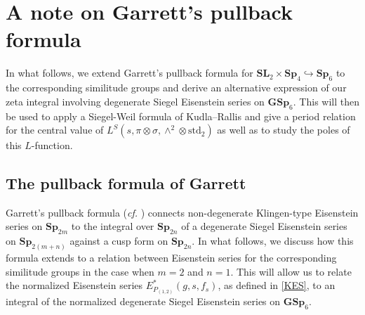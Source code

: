 \documentclass[11pt, reqno]{amsart}
\theoremstyle{plain}
\theoremstyle{definition}
\theoremstyle{remark}
\theoremstyle{plain}
\def\SL{{\mathbf{SL}}}
\def\GSp{{\mathbf{GSp}}}
\def\Sp{{\mathbf{Sp}}}
\begin{document}
\section{A note on Garrett's pullback formula}

In what follows, we extend Garrett's pullback formula for $\SL_2\times \Sp_4\hookrightarrow \Sp_6$ to the corresponding similitude groups and derive an alternative expression of our zeta integral involving degenerate Siegel Eisenstein series on $\GSp_6$. This will then be used to apply a Siegel-Weil formula of Kudla--Rallis and give a period relation for the central value of $L^S(s,\pi \otimes \sigma, \wedge^2 \otimes  \mathrm{std}_2)$ as well as to study the poles of this $L$-function. 

\subsection{The pullback formula of Garrett}\label{Section:Garrett:Pullback}
Garrett's pullback formula (\textit{cf.}  \cite[Theorem, p. 255]{GarrettIntegralRepEisenstein})  connects non-degenerate Klingen-type Eisenstein series on $\Sp_{2m}$ to the integral over $\Sp_{2n}$ of a degenerate Siegel Eisenstein series on $\Sp_{2(m+n)}$ against a cusp form on $\Sp_{2n}$. In what follows, we discuss how this formula extends to a relation between Eisenstein series for the corresponding similitude groups in the case when $m=2$ and $n=1$. This will allow us to relate the normalized Eisenstein series $E^*_{P_{(1,2)}}(g, s, f_s)$, as defined in \eqref{KES}, to an integral of the normalized degenerate Siegel Eisenstein series on $\GSp_6$. 
\end{document}
